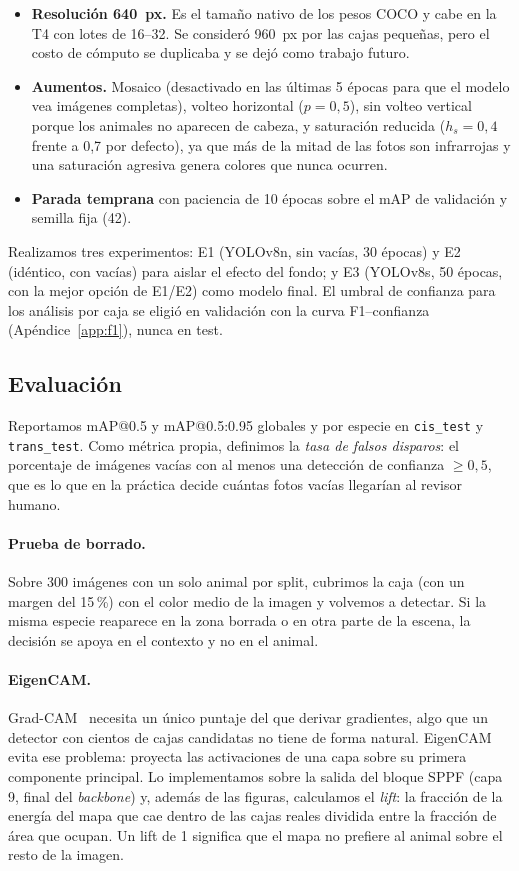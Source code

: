 \documentclass{article}
\begin{document}
\begin{itemize}
  \item \textbf{Resolución 640~px.} Es el tamaño nativo de los pesos COCO y
  cabe en la T4 con lotes de 16--32. Se consideró 960~px por las cajas
  pequeñas, pero el costo de cómputo se duplicaba y se dejó como trabajo
  futuro.
  \item \textbf{Aumentos.} Mosaico (desactivado en las últimas 5 épocas para
  que el modelo vea imágenes completas), volteo horizontal ($p=0{,}5$), sin
  volteo vertical porque los animales no aparecen de cabeza, y saturación
  reducida ($h_s=0{,}4$ frente a 0,7 por defecto), ya que más de la mitad de
  las fotos son infrarrojas y una saturación agresiva genera colores que
  nunca ocurren.
  \item \textbf{Parada temprana} con paciencia de 10 épocas sobre el mAP de
  validación y semilla fija (42).
\end{itemize}

Realizamos tres experimentos: E1 (YOLOv8n, sin vacías, 30 épocas) y E2
(idéntico, con vacías) para aislar el efecto del fondo; y E3 (YOLOv8s, 50
épocas, con la mejor opción de E1/E2) como modelo final. El umbral de
confianza para los análisis por caja se eligió en validación con la curva
F1--confianza (Apéndice~\ref{app:f1}), nunca en test.

\subsection{Evaluación}

Reportamos mAP@0.5 y mAP@0.5:0.95 globales y por especie en
\texttt{cis\_test} y \texttt{trans\_test}. Como métrica propia, definimos la
\emph{tasa de falsos disparos}: el porcentaje de imágenes vacías con al menos
una detección de confianza $\geq 0{,}5$, que es lo que en la práctica decide
cuántas fotos vacías llegarían al revisor humano.

\paragraph{Prueba de borrado.} Sobre 300 imágenes con un solo animal por split,
cubrimos la caja (con un margen del 15\,\%) con el color medio de la imagen y
volvemos a detectar. Si la misma especie reaparece en la zona borrada o en otra
parte de la escena, la decisión se apoya en el contexto y no en el animal.

\paragraph{EigenCAM.} Grad-CAM~\cite{selvaraju2017gradcam} necesita un único
puntaje del que derivar gradientes, algo que un detector con cientos de cajas
candidatas no tiene de forma natural. EigenCAM~\cite{muhammad2020eigencam}
evita ese problema: proyecta las activaciones de una capa sobre su primera
componente principal. Lo implementamos sobre la salida del bloque SPPF (capa 9,
final del \emph{backbone}) y, además de las figuras, calculamos el \emph{lift}:
la fracción de la energía del mapa que cae dentro de las cajas reales dividida
entre la fracción de área que ocupan. Un lift de 1 significa que el mapa no
prefiere al animal sobre el resto de la imagen.
\end{document}
